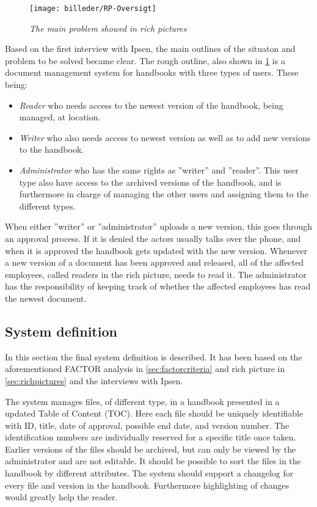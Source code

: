 \begin{figure}[H]
	\centering
	\texttt{[image: billeder/RP-Oversigt]}
	\caption{\textit{The main problem showed in rich pictures
	}}
	\label{fig:RP-Oversigt}
\end{figure}

Based on the first interview with Ipsen, the main outlines of the situaton and problem to be solved became clear.
The rough outline, also shown in \cref{fig:RP-Oversigt} is a document management system for handbooks with three types of users. These being:
\begin{itemize}
	\item
		\textit{Reader} who needs access to the newest version of the handbook, being managed, at location.
	\item
		\textit{Writer} who also needs access to newest version as well as to add new versions to the handbook.
	\item
		\textit{Administrator} who has the same rights as ''writer'' and ''reader''.
		This user type also have access to the archived versions of the handbook, and is furthermore in charge of managing the other users and assigning them to the different types.
\end{itemize}
When either ''writer'' or ''administrator'' uploads a new version, this goes through an approval process.
If it is denied the actors usually talks over the phone, and when it is approved the handbook gets updated with the new version.
Whenever a new version of a document has been approved and released, all of the affected employees, called readers in the rich picture, needs to read it.
The administrator has the responsibility of keeping track of whether the affected employees has read the newest document.

\subsection{System definition}
In this section the final system definition is described.
It has been based on the aforementioned FACTOR analysis in \cref{sec:factorcriteria} and rich picture in \cref{sec:richpictures} and the interviews with Ipsen.

The system manages files, of different type, in a handbook presented in a updated Table of Content (TOC).
Here each file should be uniquely identifiable with ID, title, date of approval, possible end date, and version number.
The identification numbers are individually reserved for a specific title once taken.
Earlier versions of the files should be archived, but can only be viewed by the administrator and are not editable.
It should be possible to sort the files in the handbook by different attributes.
The system should support a changelog for every file and version in the handbook.
Furthermore highlighting of changes would greatly help the reader.

